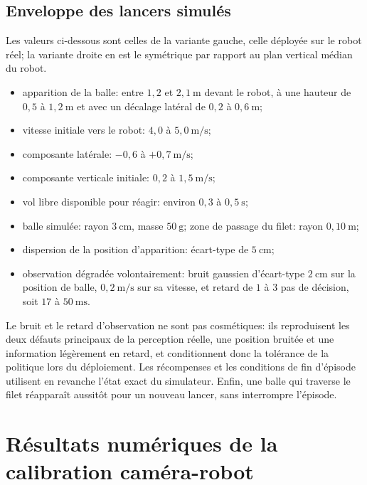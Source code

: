 \documentclass[a4paper,11pt]{report}
\begin{document}
\section*{Enveloppe des lancers simulés}

Les valeurs ci-dessous sont celles de la variante gauche, celle déployée sur le
robot réel; la variante droite en est le symétrique par rapport au plan vertical
médian du robot.

\begin{itemize}
  \item apparition de la balle: entre \(1{,}2\) et \(2{,}1~\text{m}\) devant le robot, à une hauteur de \(0{,}5\) à \(1{,}2~\text{m}\) et avec un décalage latéral de \(0{,}2\) à \(0{,}6~\text{m}\);
  \item vitesse initiale vers le robot: \(4{,}0\) à \(5{,}0~\text{m/s}\);
  \item composante latérale: \(-0{,}6\) à \(+0{,}7~\text{m/s}\);
  \item composante verticale initiale: \(0{,}2\) à \(1{,}5~\text{m/s}\);
  \item vol libre disponible pour réagir: environ \(0{,}3\) à \(0{,}5~\text{s}\);
  \item balle simulée: rayon \(3~\text{cm}\), masse \(50~\text{g}\); zone de passage du filet: rayon \(0{,}10~\text{m}\);
  \item dispersion de la position d'apparition: écart-type de \(5~\text{cm}\);
  \item observation dégradée volontairement: bruit gaussien d'écart-type \(2~\text{cm}\) sur la position de balle, \(0{,}2~\text{m/s}\) sur sa vitesse, et retard de \(1\) à \(3\) pas de décision, soit \(17\) à \(50~\text{ms}\).
\end{itemize}

Le bruit et le retard d'observation ne sont pas cosmétiques: ils reproduisent
les deux défauts principaux de la perception réelle, une position bruitée et une
information légèrement en retard, et conditionnent donc la tolérance de la
politique lors du déploiement. Les récompenses et les conditions de fin
d'épisode utilisent en revanche l'état exact du simulateur. Enfin, une balle qui
traverse le filet réapparaît aussitôt pour un nouveau lancer, sans interrompre
l'épisode.

\chapter{Résultats numériques de la calibration caméra-robot}
\label{ann:handeye}
\end{document}

